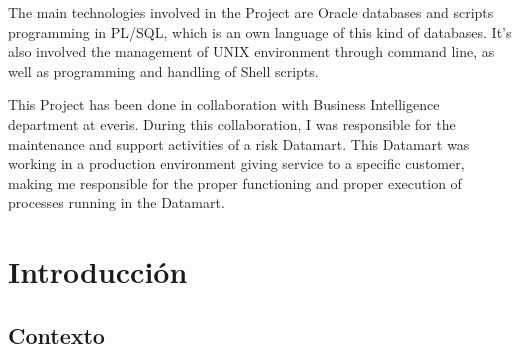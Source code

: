 \documentclass[a4paper, 12pt]{book}
\begin{document}
The main technologies involved in the Project are Oracle databases and scripts programming in PL/SQL, which is an own language of this kind of databases. It's also involved the management of UNIX environment through command line, as well as programming and handling of Shell scripts.

This Project has been done in collaboration with Business Intelligence department at everis. During this collaboration, I was responsible for the maintenance and support activities of a risk Datamart. This Datamart was working in a production environment giving service to a specific customer, making me responsible for the proper functioning and proper execution of processes running in the Datamart.




\tableofcontents 
\cleardoublepage
\listoffigures %


\cleardoublepage
\chapter{Introducción}
\label{sec:intro} %

\section{Contexto}
\label{sec:Contexto}
\end{document}
